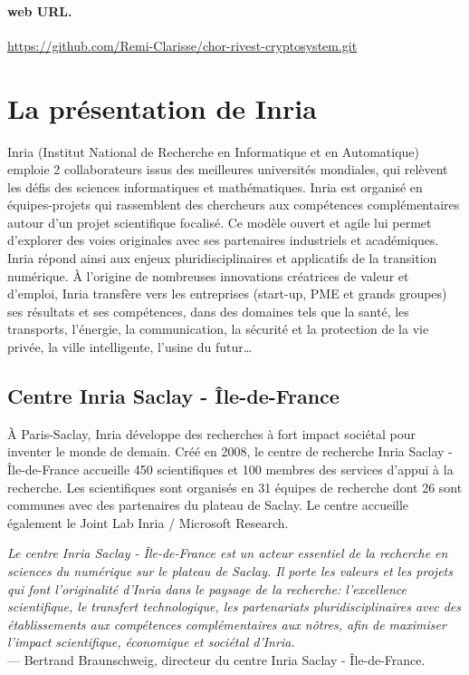 \documentclass[a4paper, titlepage, 11pt]{article}
\theoremstyle{definition}
\theoremstyle{remark}
\begin{document}
\paragraph{web URL.}\url{https://github.com/Remi-Clarisse/chor-rivest-cryptosystem.git}

\setcounter{tocdepth}{1}
\tableofcontents

\newpage

\section{La présentation de Inria}\label{sec:presInria}

Inria (Institut National de Recherche en Informatique et en Automatique) emploie 2 collaborateurs issus des meilleures universités mondiales, qui relèvent les défis des sciences informatiques et mathématiques. Inria est organisé en \og{}équipes-projets\fg{} qui rassemblent des chercheurs aux compétences complémentaires autour d’un projet scientifique focalisé. Ce modèle ouvert et agile lui permet d’explorer des voies originales avec ses partenaires industriels et académiques. Inria répond ainsi aux enjeux pluridisciplinaires et applicatifs de la transition numérique. À l'origine de nombreuses innovations créatrices de valeur et d'emploi, Inria transfère vers les entreprises (start-up, PME et grands groupes) ses résultats et ses compétences, dans des domaines tels que la santé, les transports, l'énergie, la communication, la sécurité et la protection de la vie privée, la ville intelligente, l’usine du futur\dots

\subsection{Centre Inria Saclay - Île-de-France}

À Paris-Saclay, Inria développe des recherches à fort impact sociétal pour inventer le monde de demain. Créé en 2008, le centre de recherche Inria Saclay - Île-de-France accueille 450 scientifiques et 100 membres des services d’appui à la recherche. Les scientifiques sont organisés en 31 équipes de recherche dont 26 sont communes avec des partenaires du plateau de Saclay. Le centre accueille également le Joint Lab Inria / Microsoft Research.

\textit{\og{}Le centre Inria Saclay - Île-de-France est un acteur essentiel de la recherche en sciences du numérique sur le plateau de Saclay. Il porte les valeurs et les projets qui font l’originalité d’Inria dans le paysage de la recherche: l’excellence scientifique, le transfert technologique, les partenariats pluridisciplinaires avec des établissements aux compétences complémentaires aux nôtres, afin de maximiser l’impact scientifique, économique et sociétal d’Inria.\fg{}} \\
--- Bertrand Braunschweig, directeur du centre Inria Saclay - Île-de-France.
\end{document}
